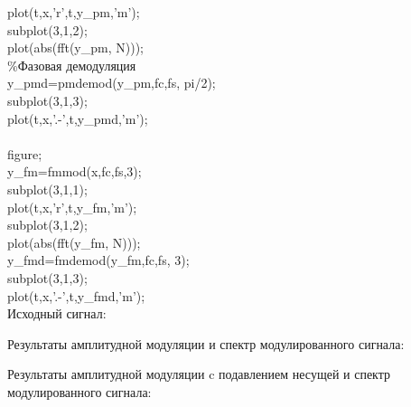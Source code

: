\documentclass[12pt,a4paper]{report}
\begin{document}
plot(t,x,'r',t,y\_pm,'m');\\
subplot(3,1,2);\\
plot(abs(fft(y\_pm, N)));\\
\%Фазовая демодуляция\\
y\_pmd=pmdemod(y\_pm,fc,fs, pi/2);\\
subplot(3,1,3);\\
plot(t,x,'.-',t,y\_pmd,'m');\\\\
figure;\\
y\_fm=fmmod(x,fc,fs,3);\\
subplot(3,1,1);\\
plot(t,x,'r',t,y\_fm,'m');\\
subplot(3,1,2);\\
plot(abs(fft(y\_fm, N)));\\
y\_fmd=fmdemod(y\_fm,fc,fs, 3);\\
subplot(3,1,3);\\
plot(t,x,'.-',t,y\_fmd,'m');\\


Исходный сигнал:

\begin{figure}[h]
\end{figure}

Результаты амплитудной модуляции и спектр модулированного сигнала:

\begin{figure}[h]
\end{figure}
\newpage
Результаты амплитудной модуляции c подавлением несущей и спектр модулированного сигнала:
\end{document}
